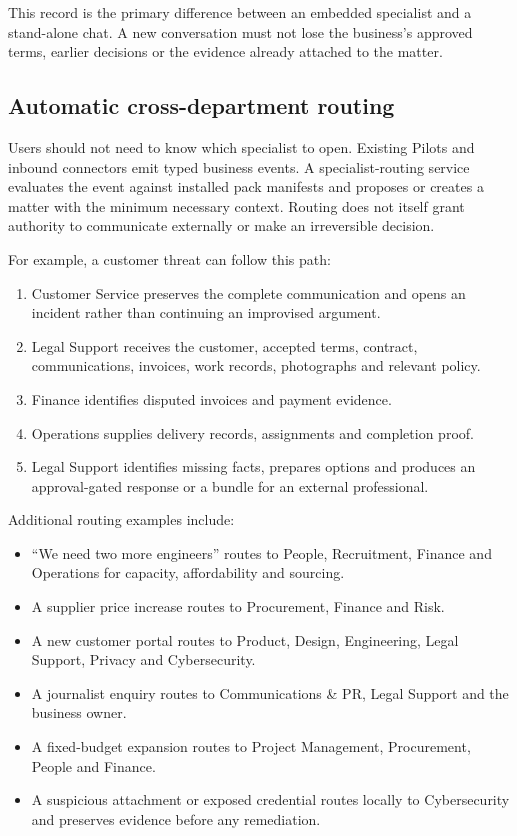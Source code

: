 This record is the primary difference between an embedded specialist and a
stand-alone chat.  A new conversation must not lose the business's approved
terms, earlier decisions or the evidence already attached to the matter.

\subsection{Automatic cross-department routing}

Users should not need to know which specialist to open.  Existing Pilots and
inbound connectors emit typed business events.  A specialist-routing service
evaluates the event against installed pack manifests and proposes or creates a
matter with the minimum necessary context.  Routing does not itself grant
authority to communicate externally or make an irreversible decision.

For example, a customer threat can follow this path:

\begin{enumerate}[leftmargin=*]
  \item Customer Service preserves the complete communication and opens an
        incident rather than continuing an improvised argument.
  \item Legal Support receives the customer, accepted terms, contract,
        communications, invoices, work records, photographs and relevant policy.
  \item Finance identifies disputed invoices and payment evidence.
  \item Operations supplies delivery records, assignments and completion proof.
  \item Legal Support identifies missing facts, prepares options and produces an
        approval-gated response or a bundle for an external professional.
\end{enumerate}

Additional routing examples include:

\begin{itemize}[leftmargin=*]
  \item ``We need two more engineers'' routes to People, Recruitment, Finance
        and Operations for capacity, affordability and sourcing.
  \item A supplier price increase routes to Procurement, Finance and Risk.
  \item A new customer portal routes to Product, Design, Engineering, Legal
        Support, Privacy and Cybersecurity.
  \item A journalist enquiry routes to Communications \& PR, Legal Support and
        the business owner.
  \item A fixed-budget expansion routes to Project Management, Procurement,
        People and Finance.
  \item A suspicious attachment or exposed credential routes locally to
        Cybersecurity and preserves evidence before any remediation.
\end{itemize}

